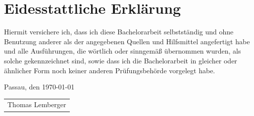 \documentclass[abstracton,bibliography=totoc,version=last,fontsize=12pt,BCOR=5mm,footinclude=false,a4paper,final,ngerman]{scrreprt}
\providecommand{\mainmatter}{}
\providecommand{\backmatter}{}
\begin{document}
\setcounter{tocdepth}{5}
\setcounter{secnumdepth}{5}
\tableofcontents
\listofalgorithms
\listoffigures
\listoftables

\mainmatter






%




\backmatter
\appendix


\chapter*{Eidesstattliche Erkl\"{a}rung}
\thispagestyle{empty}
Hiermit versichere ich, dass ich diese Bachelorarbeit selbstst\"{a}ndig und ohne
Benutzung anderer als der angegebenen Quellen und Hilfsmittel angefertigt habe
und alle Ausf\"{u}hrungen, die w\"{o}rtlich oder sinngem\"{a}\ss{} \"{u}bernommen wurden, als
solche gekennzeichnet sind, sowie dass ich die Bachelorarbeit in gleicher oder
\"{a}hnlicher Form noch keiner anderen Pr\"{u}fungsbeh\"{o}rde vorgelegt habe.

\bigskip

\noindent Passau, den \today

\bigskip\bigskip\bigskip
\noindent \begin{tabular}{c}
\hspace*{0.5\linewidth}\\
\hline
Thomas Lemberger
\end{tabular}
\end{document}
